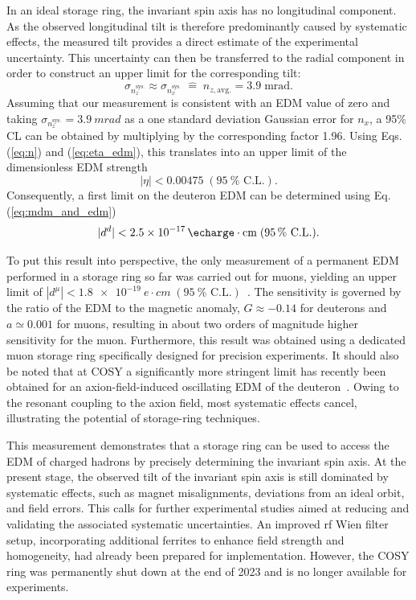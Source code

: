 \documentclass[
    10pt,
    twocolumn,
    secnumarabic,
    amssymb,
    nobibnotes,
    aps,
    prl,

    longbibliography,
    superscriptaddress
    ]{revtex4-2}
\begin{document}
In an ideal storage ring, the invariant spin axis has no longitudinal component. As the observed longitudinal tilt is therefore predominantly caused by systematic effects, the measured tilt provides a direct estimate of the experimental uncertainty. This uncertainty can then be transferred to the radial component in order to construct an upper limit for the corresponding tilt:
\begin{equation}
     \sigma_{n_z^{\text{sys.}}} \approx \sigma_{n_x^{\text{sys.}}} \;\hat{=}\; n_{z,\text{avg.}} = \SI{3.9}\;{\text{mrad}}.
\end{equation}
Assuming that our measurement is consistent with an EDM value of zero and taking $\sigma_{n_z^{\text{sys.}}}=\SI{3.9}{mrad}$ as a one standard deviation Gaussian error for $n_x$, a 95\% CL can be obtained by multiplying by the corresponding factor 1.96.
Using Eqs. (\ref{eq:n}) and (\ref{eq:eta_edm}), this translates into an upper limit of the dimensionless EDM strength
\begin{equation}
    |\eta|<0.00475 \; (\SI{95}{\%} \text{ C.L.}).
\end{equation}
Consequently, a first limit on the deuteron EDM can be determined using Eq. (\ref{eq:mdm_and_edm})
\begin{equation}
    |d^d|<\SI{2.5e-17}{\echarge\cdot cm} \; (\SI{95}{\%} \text{ C.L.}).
\end{equation}

To put this result into perspective, the only measurement of a permanent EDM performed in a storage ring so far was carried out for muons, yielding an upper limit of
 $|d^{\mu}|<\SI{1.8e-19}{e\cdot cm}\;(\SI{95}{\%}\text{ C.L.})$~\cite{PhysRevD.80.052008}.
 The sensitivity is governed by the ratio of the EDM to the magnetic anomaly, $G\approx-0.14$ for deuterons and $a \simeq 0.001$ for muons, resulting in about two orders of magnitude higher sensitivity for the muon.
Furthermore, this result was obtained using a dedicated muon storage ring specifically designed for precision experiments. It should also be noted that at COSY a significantly more stringent limit has recently been obtained for an axion-field-induced oscillating EDM of the deuteron~\cite{PhysRevX.13.031004}. Owing to the resonant coupling to the axion field, most systematic effects cancel, illustrating the potential of storage-ring techniques.

This measurement demonstrates  that a storage ring can be used to access the EDM of charged hadrons by precisely determining the invariant spin axis.
At the present stage, the observed tilt of the invariant spin axis is still dominated by systematic effects, such as magnet misalignments, deviations from an ideal orbit, and field errors.
This calls for further experimental studies aimed at reducing and validating the associated systematic uncertainties. An improved rf Wien filter setup, incorporating additional ferrites to enhance field strength and homogeneity, had already been prepared for implementation.
However, the COSY ring was permanently shut down at the end of 2023 and is no longer available for experiments.
\end{document}
